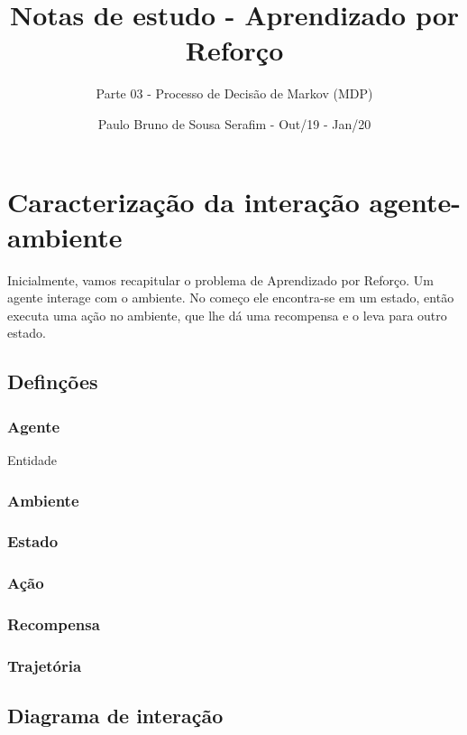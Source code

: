 \documentclass{article}
\title{Notas de estudo - Aprendizado por Reforço}
\author{Parte 03 - Processo de Decisão de Markov (MDP)}
\date{Paulo Bruno de Sousa Serafim - Out/19 - Jan/20}
\begin{document}
\maketitle

    \section{Caracterização da interação agente-ambiente}
    
        Inicialmente, vamos recapitular o problema de Aprendizado por Reforço. Um agente interage com o ambiente. No começo ele encontra-se em um estado, então executa uma ação no ambiente, que lhe dá uma recompensa e o leva para outro estado. 
    
        \subsection{Definções}
            
            \subsubsection{Agente}
            
                Entidade 
            
            \subsubsection{Ambiente}
            
                
            
            \subsubsection{Estado}
            \subsubsection{Ação}
            \subsubsection{Recompensa}
            \subsubsection{Trajetória}
            
                
            
        \subsection{Diagrama de interação}
        
\end{document}
